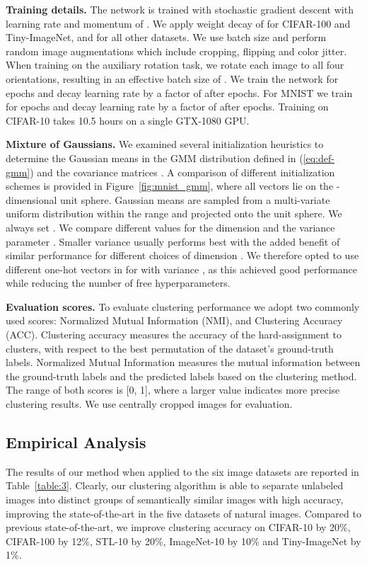 \documentclass[a4paper,conference]{IEEEtran}
\begin{document}
\textbf{Training details.} 
The network is trained with stochastic gradient descent with learning rate  and momentum of . We apply weight decay of  for CIFAR-100 and Tiny-ImageNet, and  for all other datasets. We use batch size  and perform random image augmentations which include cropping, flipping and color jitter. When training on the auxiliary rotation task, we rotate each image to all four orientations, resulting in an effective batch size of . We train the network for  epochs and decay learning rate by a factor of  after  epochs. For MNIST we train for  epochs and decay learning rate by a factor of  after  epochs. Training on CIFAR-10 takes 10.5 hours on a single GTX-1080 GPU.

\textbf{Mixture of Gaussians.} We examined several initialization heuristics to determine the Gaussian means  in the GMM distribution defined in (\ref{eq:def-gmm}) and the covariance matrices . A comparison of different initialization schemes is provided in Figure~\ref{fig:mnist_gmm}, where all vectors lie on the -dimensional unit sphere. Gaussian means  are sampled from a multi-variate uniform distribution within the range  and projected onto the unit sphere. We always set . We compare different values for the dimension  and the variance parameter . Smaller variance usually performs best with the added benefit of similar performance for different choices of dimension . We therefore opted to use  different one-hot vectors in  for  with variance , as this achieved good performance while reducing the number of free hyperparameters.

\textbf{Evaluation scores.} 
To evaluate clustering performance we adopt two commonly used scores: Normalized Mutual Information (NMI), and Clustering Accuracy (ACC). Clustering accuracy measures the accuracy of
the hard-assignment to clusters, with respect to the best permutation of the dataset’s ground-truth labels. Normalized Mutual Information measures the mutual information between the ground-truth labels and the predicted labels based on the clustering method. The range of both scores is [0, 1], where a larger value indicates more precise clustering results. We use centrally cropped images for evaluation.

\subsection{Empirical Analysis}

The results of our method when applied to the six image datasets are reported in Table~\ref{table:3}. Clearly, our clustering algorithm is able to separate unlabeled images into distinct groups of semantically similar images with high accuracy, improving the state-of-the-art in the five datasets of natural images. Compared to previous state-of-the-art, we improve clustering accuracy on CIFAR-10 by 20\%, CIFAR-100 by 12\%, STL-10 by 20\%, ImageNet-10 by 10\% and Tiny-ImageNet by 1\%.
\end{document}
